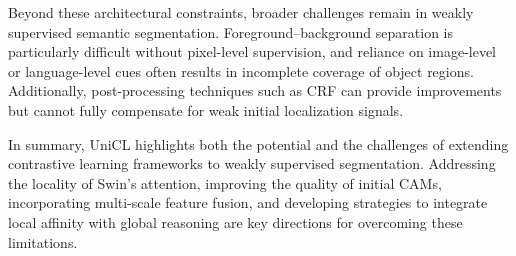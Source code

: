 Beyond these architectural constraints, broader challenges remain in weakly supervised semantic segmentation. Foreground–background separation is particularly difficult without pixel-level supervision, and reliance on image-level or language-level cues often results in incomplete coverage of object regions. Additionally, post-processing techniques such as CRF can provide improvements but cannot fully compensate for weak initial localization signals.  

In summary, UniCL highlights both the potential and the challenges of extending contrastive learning frameworks to weakly supervised segmentation. Addressing the locality of Swin’s attention, improving the quality of initial CAMs, incorporating multi-scale feature fusion, and developing strategies to integrate local affinity with global reasoning are key directions for overcoming these limitations.
